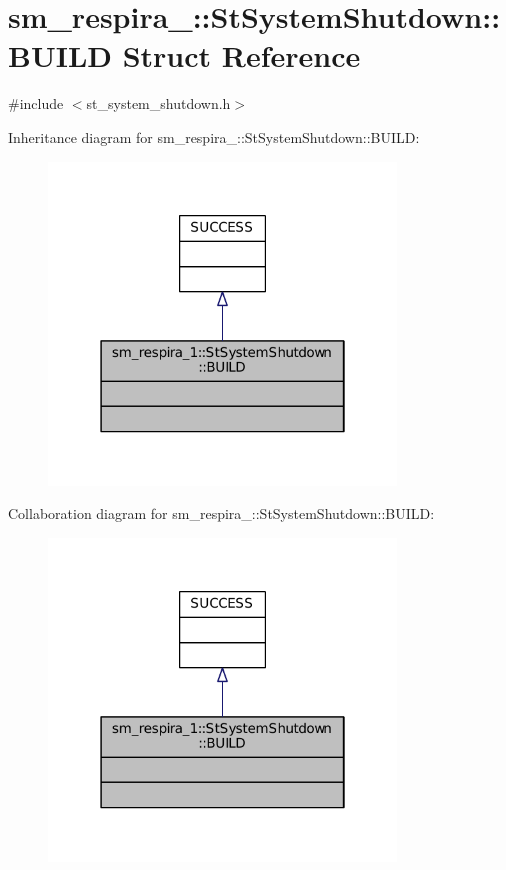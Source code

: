 \hypertarget{structsm__respira__1_1_1StSystemShutdown_1_1BUILD}{}\section{sm\+\_\+respira\+\_\+:\+:St\+System\+Shutdown\+:\+:B\+U\+I\+LD Struct Reference}
\label{structsm__respira__1_1_1StSystemShutdown_1_1BUILD}


{\ttfamily \#include $<$st\+\_\+system\+\_\+shutdown.\+h$>$}



Inheritance diagram for sm\+\_\+respira\+\_\+:\+:St\+System\+Shutdown\+:\+:B\+U\+I\+LD\+:
\nopagebreak
\begin{figure}[H]
\begin{center}
\leavevmode
\includegraphics[width=262pt]{structsm__respira__1_1_1StSystemShutdown_1_1BUILD__inherit__graph}
\end{center}
\end{figure}


Collaboration diagram for sm\+\_\+respira\+\_\+:\+:St\+System\+Shutdown\+:\+:B\+U\+I\+LD\+:
\nopagebreak
\begin{figure}[H]
\begin{center}
\leavevmode
\includegraphics[width=262pt]{structsm__respira__1_1_1StSystemShutdown_1_1BUILD__coll__graph}
\end{center}
\end{figure}


